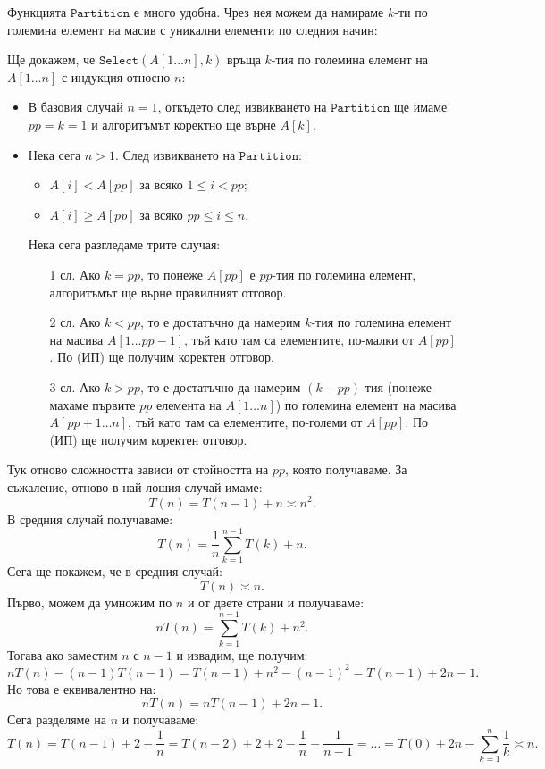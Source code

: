 Функцията $\mathtt{Partition}$ е много удобна.
Чрез нея можем да намираме $k$-ти по големина елемент на масив с уникални елементи по следния начин:

Ще докажем, че $\mathtt{Select}(A[1 \dots n], k)$ връща $k$-тия по големина елемент на $A[1 \dots n]$ с индукция относно $n$:
\begin{itemize}
    \item В базовия случай $n = 1$, откъдето след извикването на $\mathtt{Partition}$ ще имаме $pp = k = 1$ и алгоритъмът коректно ще върне $A[k]$.
    \item Нека сега $n > 1$.
          След извикването на $\mathtt{Partition}$:
          \begin{itemize}
              \item $A[i] < A[pp]$ за всяко $1 \leq i < pp$;
              \item $A[i] \geq A[pp]$ за всяко $pp \leq i \leq n$.
          \end{itemize}
          Нека сега разгледаме трите случая:
          \begin{itemize}
              \item[1 сл.] Ако $k = pp$, то понеже $A[pp]$ е $pp$-тия по големина елемент, алгоритъмът ще върне правилният отговор.
              \item[2 сл.] Ако $k < pp$, то е достатъчно да намерим $k$-тия по големина елемент на масива $A[1 \dots pp - 1]$, тъй като там са елементите, по-малки от $A[pp]$.
                    По (ИП) ще получим коректен отговор.
              \item[3 сл.] Ако $k > pp$, то е достатъчно да намерим $(k - pp)$-тия (понеже махаме първите $pp$ елемента на $A[1 \dots n]$) по големина елемент на масива $A[pp + 1 \dots n]$, тъй като там са елементите, по-големи от $A[pp]$.
                    По (ИП) ще получим коректен отговор.
          \end{itemize}
\end{itemize}
Тук отново сложността зависи от стойността на $pp$, която получаваме.
За съжаление, отново в най-лошия случай имаме:
\[
    T(n) = T(n - 1) + n \asymp n^2.
\]
В средния случай получаваме:
\[
    T(n) = \frac{1}{n} \sum\limits_{k = 1}^{n - 1} T(k) + n.
\]
Сега ще покажем, че в средния случай:
\[
    T(n) \asymp n.
\]
Първо, можем да умножим по $n$ и от двете страни и получаваме:
\[
    n T(n) = \sum\limits_{k = 1}^{n - 1} T(k) + n^2.
\]
Тогава ако заместим $n$ с $n - 1$ и извадим, ще получим:
\[
    n T(n) - (n - 1) T(n - 1) = T(n - 1) + n^2 - (n - 1)^2 = T(n - 1) + 2n - 1.
\]
Но това е еквивалентно на:
\[
    n T(n) = n T(n - 1) + 2n - 1.
\]
Сега разделяме на $n$ и получаваме:
\[
    T(n) = T(n - 1) + 2 - \frac{1}{n} = T(n - 2) + 2 + 2 - \frac{1}{n} - \frac{1}{n - 1} = \dots = T(0) + 2n - \sum\limits_{k = 1}^n \frac{1}{k} \asymp n.
\]

